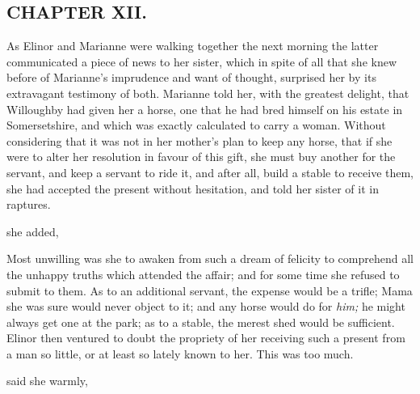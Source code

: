 \subsection[chapter-xii.]{\useURL[url12][][][]\from[url12]CHAPTER XII.}

As Elinor and Marianne were walking together the next morning the latter communicated a piece of news to her sister, which in spite of all that she knew before of Marianne's imprudence and want of thought, surprised her by its extravagant testimony of both. Marianne told her, with the greatest delight, that Willoughby had given her a horse, one that he had bred himself on his estate in Somersetshire, and which was exactly calculated to carry a woman. Without considering that it was not in her mother's plan to keep any horse, that if she were to alter her resolution in favour of this gift, she must buy another for the servant, and keep a servant to ride it, and after all, build a stable to receive them, she had accepted the present without hesitation, and told her sister of it in raptures.

 she added, 

Most unwilling was she to awaken from such a dream of felicity to comprehend all the unhappy truths which attended the affair; and for some time she refused to submit to them. As to an additional servant, the expense would be a trifle; Mama she was sure would never object to it; and any horse would do for {\em him;} he might always get one at the park; as to a stable, the merest shed would be sufficient. Elinor then ventured to doubt the propriety of her receiving such a present from a man so little, or at least so lately known to her. This was too much.

 said she warmly, 

